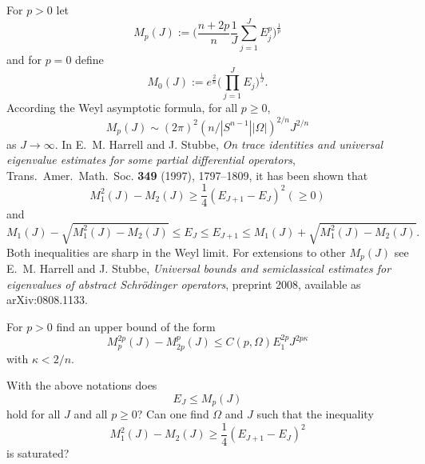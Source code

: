 \documentclass[12pt,letterpaper, reqno]{aimpl}
\begin{document}
\begin{problemblock}
For $p>0$ let
\begin{equation}\label{ev-moments}
    M_{p}(J):=\bigg(\frac{n+2p}{n}\frac1{J}\sum_{j=1}^JE_j^p\bigg)^{\frac1{p}}
\end{equation}
and for $p=0$ define
\begin{equation}\label{geom-mean}
    M_{0}(J):=e^{\frac{2}{n}}\bigg(\prod_{j=1}^JE_j\bigg)^{\frac1{J}}.
\end{equation}
According the Weyl asymptotic formula, for all $p\geq 0$,
\begin{equation*}
    M_{p}(J) \sim (2\pi)^2(n/|S^{n-1}||\Omega|)^{2/n}J^{2/n}
\end{equation*}
as $J\rightarrow\infty$. In E.~M. Harrell and J. Stubbe, \textit{On trace identities and
universal eigenvalue estimates for some partial differential
operators}, {Trans.\ Amer.\ Math.\ Soc.} \textbf{349} (1997),
1797--1809, it has been shown that
\begin{equation*}
    M_1^2(J)-M_{2}(J)\geq \frac1{4}(E_{J+1}-E_J)^2 (\geq 0)
\end{equation*}
and
\begin{equation*}
    M_1(J)-\sqrt{M_1^2(J)-M_{2}(J)}\leq E_J\leq E_{J+1}\leq
    M_1(J)+\sqrt{M_1^2(J)-M_{2}(J)}.
\end{equation*}
Both inequalities are sharp in the Weyl limit. For extensions to
other $M_p(J)$ see E.~M. Harrell and J. Stubbe, \textit{Universal bounds and
semiclassical estimates for eigenvalues of abstract Schr\"odinger
operators}, preprint 2008, available as arXiv:0808.1133.
\begin{problem}[1.6]
For $p>0$ find an upper bound of
the form
\begin{equation*}
    M_p^{2p}(J)-M_{2p}^p(J)\leq C(p,\Omega)E_1^{2p}J^{2p\kappa}
\end{equation*}
with $\kappa<2/n$.

\end{problem}

\end{problemblock}

\begin{problemblock}


\begin{problem}[1.65]
With the above notations does
\begin{equation*}
    E_J\leq M_p(J)
\end{equation*}
hold for all $J$ and all $p\geq 0$?
Can one find $\Omega$ and $J$ such that the inequality
\begin{equation*}
    M_1^2(J)-M_{2}(J)\geq \frac1{4}(E_{J+1}-E_J)^2
\end{equation*}
is saturated?
\end{problem}


\end{problemblock}
\end{document}

